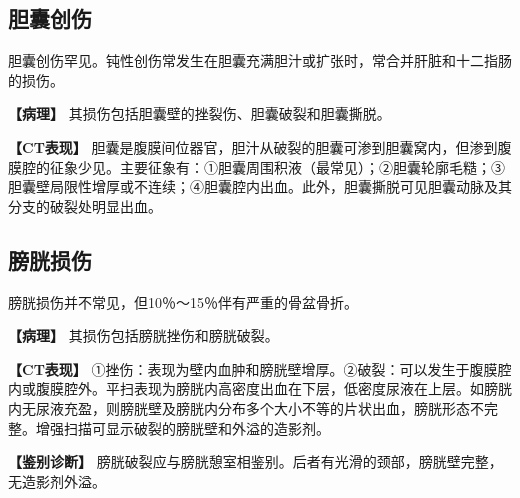 \subsection{胆囊创伤}

胆囊创伤罕见。钝性创伤常发生在胆囊充满胆汁或扩张时，常合并肝脏和十二指肠的损伤。

\textbf{【病理】} 其损伤包括胆囊壁的挫裂伤、胆囊破裂和胆囊撕脱。

\textbf{【CT表现】}
胆囊是腹膜间位器官，胆汁从破裂的胆囊可渗到胆囊窝内，但渗到腹膜腔的征象少见。主要征象有：①胆囊周围积液（最常见）；②胆囊轮廓毛糙；③胆囊壁局限性增厚或不连续；④胆囊腔内出血。此外，胆囊撕脱可见胆囊动脉及其分支的破裂处明显出血。

\subsection{膀胱损伤}

膀胱损伤并不常见，但10％～15％伴有严重的骨盆骨折。

\textbf{【病理】} 其损伤包括膀胱挫伤和膀胱破裂。

\textbf{【CT表现】}
①挫伤：表现为壁内血肿和膀胱壁增厚。②破裂：可以发生于腹膜腔内或腹膜腔外。平扫表现为膀胱内高密度出血在下层，低密度尿液在上层。如膀胱内无尿液充盈，则膀胱壁及膀胱内分布多个大小不等的片状出血，膀胱形态不完整。增强扫描可显示破裂的膀胱壁和外溢的造影剂。

\textbf{【鉴别诊断】}
膀胱破裂应与膀胱憩室相鉴别。后者有光滑的颈部，膀胱壁完整，无造影剂外溢。

\protect\hypertarget{text00028.html}{}{}

